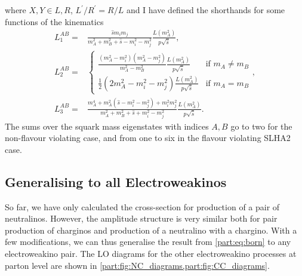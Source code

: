 \documentclass[../main.tex]{subfiles}
\begin{document}
where \(X,Y \in L,R\), \(L^\prime/R^\prime = R/L\) and I have defined the shorthands for some functions of the kinematics
\begin{subequations}
  \begin{align}
    L_1^{AB} = & \frac{\hat{s}m_i m_j}{m_A^2+m_B^2 + \hat{s} - m_i^2 - m_j^2} \frac{L(m_A^2)}{p \sqrt{\hat{s}}},                                                                                                                                                         \\
    L_2^{AB} = & \begin{cases}\frac{(m_A^2-m_i^2)(m_A^2-m_j^2)}{m_A^2-m_B^2} \frac{L(m_A^2)}{p \sqrt{\hat{s}}} & \text{if } m_A \neq m_B \\ \frac{1}{2}(2 m_A^2 - m_i^2 - m_j^2) \frac{L(m_A^2)}{p \sqrt{\hat{s}}} & \text{if } m_A = m_B \end{cases}, \\
    L_3^{AB} = & \frac{m_A^4 + m_A^2(\hat{s}-m_i^2-m_j^2) + m_i^2 m_j^2}{m_A^2+m_B^2 + \hat{s} + m_i^2 - m_j^2} \frac{L(m_A^2)}{p \sqrt{\hat{s}}}.
  \end{align}
\end{subequations}
The sums over the squark mass eigenstates with indices \(A, B\) go to two for the non-flavour violating case, and from one to six in the flavour violating SLHA2 case.


\subsection{Generalising to all Electroweakinos}
So far, we have only calculated the cross-section for production of a pair of neutralinos.
However, the amplitude structure is very similar both for pair production of charginos and production of a neutralino with a chargino.
With a few modifications, we can thus generalise the result from \cref{part:eq:born} to any electroweakino pair.
The LO diagrams for the other electroweakino processes at parton level are shown in \cref{part:fig:NC_diagrams,part:fig:CC_diagrams}.

\begin{figure}[ht!]
  \centering
  \caption{}
  \label{part:fig:NC_diagrams}
\end{figure}

\begin{figure}[ht!]
  \centering
  \caption{}
  \label{part:fig:CC_diagrams}
\end{figure}
\end{document}
